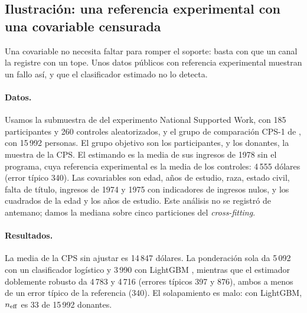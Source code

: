\subsection{Ilustración: una referencia experimental con una covariable censurada}\label{sec:lalonde}

Una covariable no necesita faltar para romper el soporte: basta con que un canal la registre con un tope. Unos datos públicos con referencia experimental muestran un fallo así, y que el clasificador estimado no lo detecta.

\paragraph{Datos.} Usamos la submuestra de \citet{dehejia1999} del experimento National Supported Work, con 185 participantes y 260 controles aleatorizados, y el grupo de comparación CPS-1 de \citet{lalonde1986}, con 15\,992 personas. El grupo objetivo son los participantes, y los donantes, la muestra de la CPS. El estimando es la media de sus ingresos de 1978 sin el programa, cuya referencia experimental es la media de los controles: 4\,555 dólares (error típico 340). Las covariables son edad, años de estudio, raza, estado civil, falta de título, ingresos de 1974 y 1975 con indicadores de ingresos nulos, y los cuadrados de la edad y los años de estudio. Este análisis no se registró de antemano; damos la mediana sobre cinco particiones del \emph{cross-fitting}.

\paragraph{Resultados.} La media de la CPS sin ajustar es 14\,847 dólares. La ponderación sola da 5\,092 con un clasificador logístico y 3\,990 con LightGBM \citep{ke2017}, mientras que el estimador doblemente robusto da 4\,783 y 4\,716 (errores típicos 397 y 876), ambos a menos de un error típico de la referencia (340). El solapamiento es malo: con LightGBM, $n_{\mathrm{eff}}$ es 33 de 15\,992 donantes.

